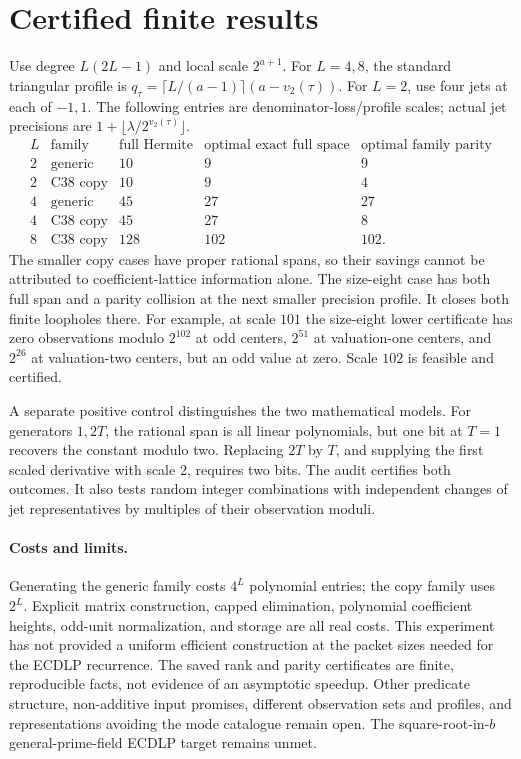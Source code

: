 \documentclass[11pt]{article}
\begin{document}
\section{Certified finite results}
Use degree $L(2L-1)$ and local scale $2^{a+1}$. For $L=4,8$, the
standard triangular profile is
$q_\tau=\lceil L/(a-1)\rceil(a-v_2(\tau))$.
For $L=2$, use four jets at each of $-1,1$.
The following entries are denominator-loss/profile scales; actual jet
precisions are $1+\lfloor\lambda/2^{v_2(\tau)}\rfloor$.
\[
 \begin{array}{c|l|r|r|r}
 L&\text{family}&\text{full Hermite}&
       \text{optimal exact full space}&\text{optimal family parity}\\\hline
 2&\text{generic}&10&9&9\\
 2&\text{C38 copy}&10&9&4\\
 4&\text{generic}&45&27&27\\
 4&\text{C38 copy}&45&27&8\\
 8&\text{C38 copy}&128&102&102.
 \end{array}
\]
The smaller copy cases have proper rational spans, so their savings
cannot be attributed to coefficient-lattice information alone. The
size-eight case has both full span and a parity collision at the next
smaller precision profile. It closes both finite loopholes there.
For example, at scale $101$ the size-eight lower certificate has zero
observations modulo $2^{102}$ at odd centers, $2^{51}$ at valuation-one
centers, and $2^{26}$ at valuation-two centers, but an odd value at zero.
Scale $102$ is feasible and certified.

A separate positive control distinguishes the two mathematical models.
For generators $1,2T$, the rational span is all linear polynomials, but
one bit at $T=1$ recovers the constant modulo two. Replacing $2T$ by
$T$, and supplying the first scaled derivative with scale $2$, requires
two bits. The audit certifies both outcomes. It also tests random
integer combinations with independent changes of jet representatives
by multiples of their observation moduli.

\paragraph{Costs and limits.}
Generating the generic family costs $4^L$ polynomial entries; the copy
family uses $2^L$. Explicit matrix construction, capped elimination,
polynomial coefficient heights, odd-unit normalization, and storage are
all real costs. This experiment has not provided a uniform efficient
construction at the packet sizes needed for the ECDLP recurrence.
The saved rank and parity certificates are finite, reproducible facts,
not evidence of an asymptotic speedup. Other predicate structure,
non-additive input promises, different observation sets and profiles,
and representations avoiding the mode catalogue remain open.
The square-root-in-$b$ general-prime-field ECDLP target remains unmet.
\end{document}
